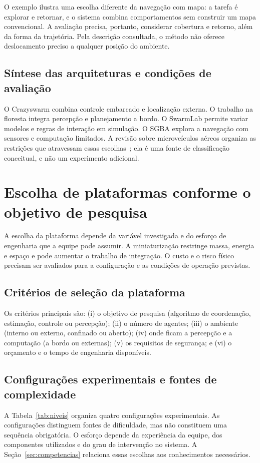\documentclass[11pt,a4paper,oneside]{book}
\numberwithin{equation}{chapter}
\begin{document}
O exemplo ilustra uma escolha diferente da navegação com mapa: a tarefa é explorar e retornar, e o sistema combina comportamentos sem construir um mapa convencional. A avaliação precisa, portanto, considerar cobertura e retorno, além da forma da trajetória. Pela descrição consultada, o método não oferece deslocamento preciso a qualquer posição do ambiente.

\section{Síntese das arquiteturas e condições de avaliação}
O Crazyswarm combina controle embarcado e localização externa. O trabalho na floresta integra percepção e planejamento a bordo. O SwarmLab permite variar modelos e regras de interação em simulação. O SGBA explora a navegação com sensores e computação limitados. A revisão sobre microveículos aéreos organiza as restrições que atravessam essas escolhas~\cite{survey}; ela é uma fonte de classificação conceitual, e não um experimento adicional.

\chapter[Escolha de plataformas]{Escolha de plataformas conforme o objetivo de pesquisa}\label{cap:plat}
A escolha da plataforma depende da variável investigada e do esforço de engenharia que a equipe pode assumir. A miniaturização restringe massa, energia e espaço e pode aumentar o trabalho de integração. O custo e o risco físico precisam ser avaliados para a configuração e as condições de operação previstas.

\section{Critérios de seleção da plataforma}
Os critérios principais são: (i) o objetivo de pesquisa (algoritmo de coordenação, estimação, controle ou percepção); (ii) o número de agentes; (iii) o ambiente (interno ou externo, confinado ou aberto); (iv) onde ficam a percepção e a computação (a bordo ou externas); (v) os requisitos de segurança; e (vi) o orçamento e o tempo de engenharia disponíveis.

\section{Configurações experimentais e fontes de complexidade}
A Tabela~\ref{tab:niveis} organiza quatro configurações experimentais. As configurações distinguem fontes de dificuldade, mas não constituem uma sequência obrigatória. O esforço depende da experiência da equipe, dos componentes utilizados e do grau de intervenção no sistema. A Seção~\ref{sec:competencias} relaciona essas escolhas aos conhecimentos necessários.
\end{document}
